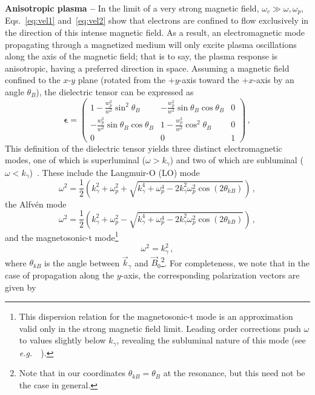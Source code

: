 \documentclass[twocolumn,superscriptaddress,floatfix,preprintnumbers,prd,nofootinbib,aps,10pt]{revtex4-2}
\renewcommand\({\left(}
\renewcommand\){\right)}
\renewcommand\[{\left[}
\renewcommand\]{\right]}
\newcommand\eg{{\it e.g.}~}
\begin{document}
{\bf Anisotropic plasma -- }In the limit of a very strong magnetic field, $\omega_c \gg \omega, \omega_p$, Eqs.~\ref{eq:vel1} and~\ref{eq:vel2} show that electrons are confined to flow exclusively in the direction of this intense magnetic field. As a result, an electromagnetic mode propagating through a magnetized medium will only excite plasma oscillations along the axis of the magnetic field; that is to say, the plasma response is anisotropic, having a preferred direction in space. Assuming a magnetic field confined to the $x$-$y$ plane (rotated from the $+y$-axis toward the $+x$-axis by an angle $\theta_B$), the dielectric tensor can be expressed as~\cite{swanson2003plasma} 
%
\begin{equation}\label{eq:dielectrictensor}
    \boldsymbol\epsilon = \left(\begin{array}{cccc}
    1 - \frac{w_p^2}{w^2} \sin^2 \theta_B & -\frac{w_p^2}{w^2} \sin \theta_B \cos \theta_B & 0 \\
    -\frac{w_p^2}{w^2} \sin \theta_B \cos \theta_B & 1 - \frac{w_p^2}{w^2} \cos^2 \theta_B  & 0 \\
    0 & 0 & 1
    \end{array}\right) \, ,
\end{equation}
%
This definition of the dielectric tensor yields three distinct electromagnetic modes, one of which is superluminal ($\omega > k_\gamma$) and two of which are subluminal ($\omega < k_\gamma$)~\cite{Witte2021, millar2021axionphotonUPDATED, mcdonald2023axionphoton}. These include the Langmuir-O (LO) mode
%
\begin{equation}
    \omega^2 = \frac{1}{2}\left(k_\gamma^2 + \omega_p^2 + \sqrt{k_\gamma^4 + \omega_p^4 - 2k_\gamma^2 \omega_p^2 \cos(2 \theta_{kB})}\right) \, , 
\end{equation}
%
the Alfv\'{e}n mode
%
\begin{equation}
    \omega^2 = \frac{1}{2}\left(k_\gamma^2 + \omega_p^2 - \sqrt{k_\gamma^4 + \omega_p^4 - 2k_\gamma^2 \omega_p^2 \cos(2 \theta_{kB})}\right) \, ,
\end{equation}
%
and the magnetosonic-t mode\footnote{This dispersion relation for the magnetosonic-t mode is an approximation valid only in the strong magnetic field limit. Leading order corrections push $\omega$ to values slightly below $k_\gamma$, revealing the subluminal nature of this mode (see \eg~\cite{Gedalin1998}).}
%
\begin{equation}
    \omega^2 = k_\gamma^2 \, ,
\end{equation}
%
where $\theta_{kB}$ is the angle between $\vec{k}_\gamma$ and $\vec{B}_0$\footnote{Note that in our coordinates $\theta_{kB} = \theta_B$ at the resonance, but this need not be the case in general.}. For completeness, we note that in the case of propagation along the $y$-axis, the corresponding polarization vectors are given by
\end{document}
